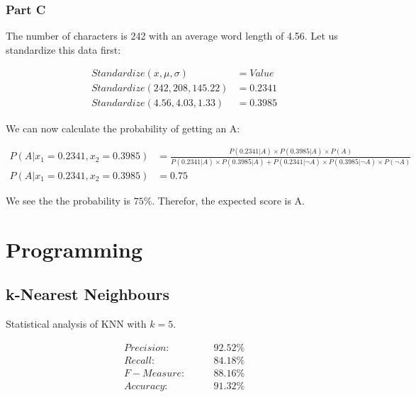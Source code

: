 \documentclass[12pt]{article}
\begin{document}
\subsubsection{Part C}
\noindent
The number of characters is 242 with an average word length of 4.56. Let us standardize this data first:

\begin{center}
    \begin{align*}
        Standardize(x, \mu, \sigma) &= Value\\
        Standardize(242, 208, 145.22) &= 0.2341\\
        Standardize(4.56, 4.03, 1.33) &= 0.3985
    \end{align*}
\end{center}

\noindent
We can now calculate the probability of getting an A:
\begin{center}
    \begin{align*} 
        P(A|x_1=0.2341, x_2=0.3985) &= \frac{P(0.2341|A) \times P(0.3985|A) \times P(A)}{P(0.2341|A) \times P(0.3985|A) + P(0.2341|\neg A) \times P(0.3985|\neg A) \times P(\neg A)} \\
        P(A|x_1=0.2341, x_2=0.3985) &= 0.75
    \end{align*}
\end{center}

\noindent
We see the the probability is $ 75\% $. Therefor, the expected score is A.

\newpage
\section{Programming}
\subsection{k-Nearest Neighbours}

\noindent
Statistical analysis of KNN with $k=5$.
\begin{center}
\begin{align*}
Precision:\qquad &92.52\% \\
Recall:\qquad &84.18\% \\
F-Measure:\qquad &88.16\% \\  
Accuracy:\qquad &91.32\% 
\end{align*}
\end{center}
\end{document}
